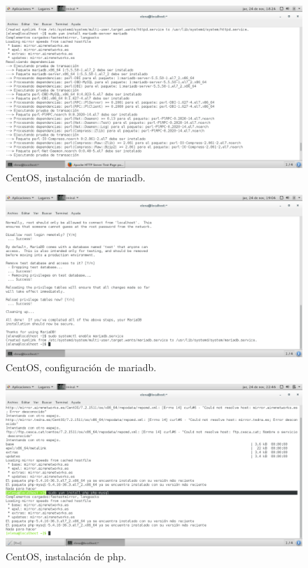 \begin{figure}[H] 
	\centering
	\includegraphics[width=15cm]{./img/ejercicio9_5.png} 	
	\caption{CentOS, instalación de mariadb.} \label{fig:ejercicio9_5}
\end{figure}


\begin{figure}[H] 
	\centering
	\includegraphics[width=15cm]{./img/ejercicio9_6.png} 	
	\caption{CentOS, configuración de mariadb.} \label{fig:ejercicio9_6}
\end{figure}


\begin{figure}[H] 
	\centering
	\includegraphics[width=15cm]{./img/ejercicio9_2.png} 	
	\caption{CentOS, instalación de php.} \label{fig:ejercicio9_2}
\end{figure}

